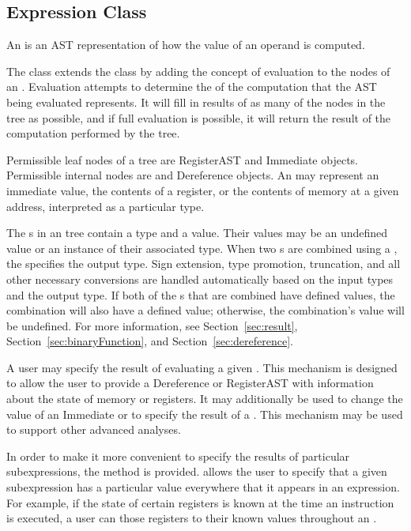 \subsection{Expression Class}
\label{sec:expression}

An  is an AST representation of how the value of an operand is
computed.

The  class extends the  class by adding the concept of
evaluation to the nodes of an . Evaluation attempts to determine
the  of the
computation that the AST being evaluated represents. It will fill in results of
as many of the nodes in the tree as possible, and if full evaluation is
possible, it will return the result of the computation performed by the tree.

Permissible leaf nodes of a  tree are RegisterAST and Immediate
objects. Permissible internal nodes are  and Dereference objects.
An  may represent an immediate value, the contents of a register, or
the contents of memory at a given address, interpreted as a particular type.

The s in an  tree contain a type and a value. Their values may
be an undefined value or an instance of their associated type. When two s
are combined using a , the  specifies the output
type. Sign extension, type promotion, truncation, and all other necessary
conversions are handled automatically based on the input types and the output
type. If both of the s that are combined have defined values, the
combination will also have a defined value; otherwise, the combination's value
will be undefined. For more information, see
Section~\ref{sec:result}, Section~\ref{sec:binaryFunction}, and
Section~\ref{sec:dereference}.

A user may specify the result of evaluating a given . This mechanism
is designed to allow the user to provide a Dereference or RegisterAST with
information about the state of memory or registers. It may additionally be used
to change the value of an Immediate or to specify the result of a
. This mechanism may be used to support other advanced analyses.

In order to make it more convenient to specify the results of particular
subexpressions, the  method is provided.  allows the user
to specify that a given subexpression has a particular value everywhere that it
appears in an expression. For example, if the state of certain registers is
known at the time an instruction is executed, a user can  those
registers to their known values throughout an .

